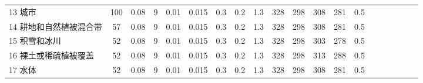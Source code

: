 \begin{landscape}
\begin{table}[htbp]
\begin{tabular}{@{}lccccccccccccccccccc@{}}
        13 城市        & 100 & 0.08 & 9 & 0.01 & 0.015 & 0.3 & 0.2 & 1.3 & 328 & 298 & 308 & 281 & 0.5 \\
        14 耕地和自然植被混合带 & 57  & 0.08 & 9 & 0.01 & 0.015 & 0.3 & 0.2 & 1.3 & 328 & 298 & 308 & 281 & 0.5 \\
        15 积雪和冰川      & 52  & 0.08 & 9 & 0.01 & 0.015 & 0.3 & 0.2 & 1.3 & 328 & 298 & 303 & 278 & 0.5 \\
        16 裸土或稀疏植被覆盖  & 52  & 0.08 & 9 & 0.01 & 0.015 & 0.3 & 0.2 & 1.3 & 328 & 298 & 313 & 288 & 0.5 \\
        17 水体          & 52  & 0.08 & 9 & 0.01 & 0.015 & 0.3 & 0.2 & 1.3 & 328 & 298 & 308 & 281 & 0.5 \\\bottomrule
        \end{tabular}
\end{table}
\end{landscape}



